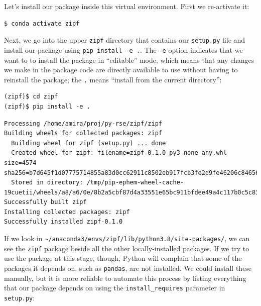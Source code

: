 \documentclass[
]{krantz}
\begin{document}
Let's install our package inside this virtual environment.
First we re-activate it:

\begin{verbatim}
$ conda activate zipf
\end{verbatim}

Next,
we go into the upper \texttt{zipf} directory that contains our \texttt{setup.py} file
and install our package using \texttt{pip\ install\ -e\ .}.
The \texttt{-e} option indicates that we want to to install the package in ``editable'' mode,
which means that any changes we make in the package code are directly available to use
without having to reinstall the package;
the \texttt{.} means ``install from the current directory'':

\begin{verbatim}
(zipf)$ cd zipf
(zipf)$ pip install -e .
\end{verbatim}

\begin{verbatim}
Processing /home/amira/proj/py-rse/zipf/zipf
Building wheels for collected packages: zipf
  Building wheel for zipf (setup.py) ... done
  Created wheel for zipf: filename=zipf-0.1.0-py3-none-any.whl size=4574 sha256=b7d645f1d07775714855a83d0cc62911c8502eb917fcb3fe2d9fe46206c84656
  Stored in directory: /tmp/pip-ephem-wheel-cache-19cuetii/wheels/a8/a6/0e/8b2a5cbf87d4a33551e65bc911bfdee49a4c117b0c5c834a47
Successfully built zipf
Installing collected packages: zipf
Successfully installed zipf-0.1.0
\end{verbatim}

If we look in \texttt{\textasciitilde{}/anaconda3/envs/zipf/lib/python3.8/site-packages/},
we can see the \texttt{zipf} package beside all the other locally-installed packages.
If we try to use the package at this stage,
though,
Python will complain that some of the packages it depends on,
such as \texttt{pandas},
are not installed.
We could install these manually,
but it is more reliable to automate this process
by listing everything that our package depends on
using the \texttt{install\_requires} parameter in \texttt{setup.py}:
\end{document}
